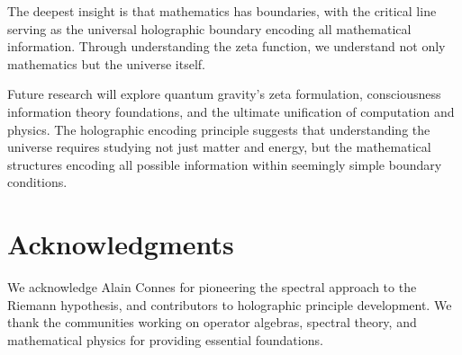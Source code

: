 \documentclass[12pt]{article}
\begin{document}
The deepest insight is that mathematics has boundaries, with the critical line serving as the universal holographic boundary encoding all mathematical information. Through understanding the zeta function, we understand not only mathematics but the universe itself.

Future research will explore quantum gravity's zeta formulation, consciousness information theory foundations, and the ultimate unification of computation and physics. The holographic encoding principle suggests that understanding the universe requires studying not just matter and energy, but the mathematical structures encoding all possible information within seemingly simple boundary conditions.

\section*{Acknowledgments}

We acknowledge Alain Connes for pioneering the spectral approach to the Riemann hypothesis, and contributors to holographic principle development. We thank the communities working on operator algebras, spectral theory, and mathematical physics for providing essential foundations.
\end{document}
